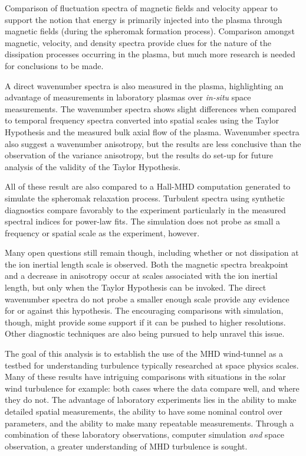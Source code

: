 \documentclass[aip,prl,amsmath,amssymb,reprint,superscriptaddress]{revtex4-1} %
\begin{document}
Comparison of fluctuation spectra of magnetic fields and velocity appear to support the notion that energy is primarily injected into the plasma through magnetic fields (during the spheromak formation process). Comparison amongst magnetic, velocity, and density spectra provide clues for the nature of the dissipation processes occurring in the plasma, but much more research is needed for conclusions to be made.

A direct wavenumber spectra is also measured in the plasma, highlighting an advantage of measurements in laboratory plasmas over {\it in-situ} space measurements. The wavenumber spectra shows slight differences when compared to temporal frequency spectra converted into spatial scales using the Taylor Hypothesis and the measured bulk axial flow of the plasma. Wavenumber spectra also suggest a wavenumber anisotropy, but the results are less conclusive than the observation of the variance anisotropy, but the results do set-up for future analysis of the validity of the Taylor Hypothesis.

All of these result are also compared to a Hall-MHD computation generated to simulate the spheromak relaxation process. Turbulent spectra using synthetic diagnostics compare favorably to the experiment particularly in the measured spectral indices for power-law fits. The simulation does not probe as small a frequency or spatial scale as the experiment, however.

Many open questions still remain though, including whether or not dissipation at the ion inertial length scale is observed. Both the magnetic spectra breakpoint and a decrease in anisotropy occur at scales associated with the ion inertial length, but only when the Taylor Hypothesis can be invoked. The direct wavenumber spectra do not probe a smaller enough scale provide any evidence for or against this hypothesis. The encouraging comparisons with simulation, though, might provide some support if it can be pushed to higher resolutions. Other diagnostic techniques are also being pursued to help unravel this issue.

The goal of this analysis is to establish the use of the MHD wind-tunnel as a testbed for understanding turbulence typically researched at space physics scales. Many of these results have intriguing comparisons with situations in the solar wind turbulence for example: both cases where the data compare well, and where they do not. The advantage of laboratory experiments lies in the ability to make detailed spatial measurements, the ability to have some nominal control over parameters, and the ability to make many repeatable measurements. Through a combination of these laboratory observations, computer simulation {\it and} space observation, a greater understanding of MHD turbulence is sought.
\end{document}
